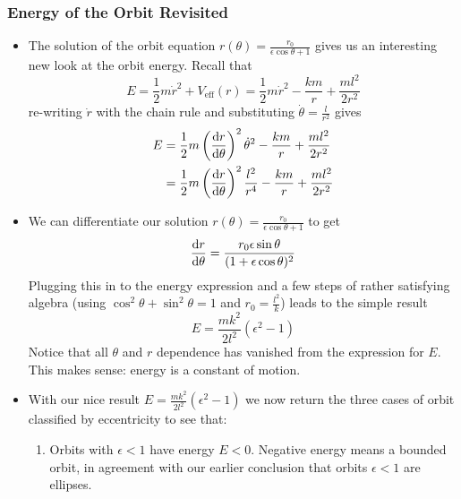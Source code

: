 \documentclass[11pt, a4paper]{article}
\newcommand{\veff}{V_{\text{eff}}}  %
\begin{document}
\subsubsection{Energy of the Orbit Revisited}
\begin{itemize}
	\item The solution of the orbit equation $ r(\theta)  = \frac{r_{0}}{\epsilon \cos \theta + 1}$ gives us an interesting new look at the orbit energy. Recall that
	\begin{equation*}
		E = \frac{1}{2}m\dot{r}^{2} + \veff(r) = \frac{1}{2}m\dot{r}^{2} - \frac{km}{r} + \frac{ml^{2}}{2r^{2}}
	\end{equation*}
	re-writing $ \dot{r} $ with the chain rule and substituting $ \dot{\theta} = \frac{l}{r^{2}} $ gives
	\begin{align*}
		E &= \frac{1}{2}m \left(\dv{r}{\theta}\right)^{2} \dot{\theta}^{2} - \frac{km}{r} + \frac{ml^{2}}{2r^{2}} \\
		& = \frac{1}{2}m \left(\dv{r}{\theta}\right)^{2} \frac{l^{2}}{r^{4}} - \frac{km}{r} + \frac{ml^{2}}{2r^{2}}
	\end{align*}
	
	\item We can differentiate our solution $ r(\theta) = \frac{r_{0}}{\epsilon \cos \theta + 1} $ to get
	\begin{equation*}
		\dv{r}{\theta} = \frac{r_{0}\epsilon \sin \theta}{(1 + \epsilon \cos \theta)^{2}}
	\end{equation*}
	Plugging this in to the energy expression and a few steps of rather satisfying algebra (using $ \cos^{2} \theta + \sin^{2} \theta = 1 $ and $ r_{0} = \frac{l^{2}}{k} $) leads to the simple result
	\begin{equation*}
		E = \frac{mk^{2}}{2l^{2}} (\epsilon^{2} - 1)
	\end{equation*}
	Notice that all $ \theta $ and $ r $ dependence has vanished from the expression for $ E $. This makes sense: energy is a constant of motion.
	
	\item With our nice result $ E = \frac{mk^{2}}{2l^{2}} (\epsilon^{2} - 1) $ we now return the three cases of orbit classified by eccentricity to see that:
	\begin{enumerate}
		\item Orbits with $ \epsilon < 1 $ have energy $ E < 0 $. Negative energy means a bounded orbit, in agreement with our earlier conclusion that orbits $ \epsilon < 1 $ are ellipses.
		

\end{enumerate}
\end{itemize}
\end{document}
